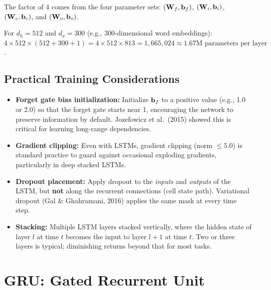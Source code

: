 \noindent The factor of 4 comes from the four parameter sets:
$(\mathbf{W}_f, \mathbf{b}_f)$, $(\mathbf{W}_i, \mathbf{b}_i)$, $(\mathbf{W}_c, \mathbf{b}_c)$, and
$(\mathbf{W}_o, \mathbf{b}_o)$.

\begin{example}
For $d_h = 512$ and $d_x = 300$ (e.g., 300-dimensional word embeddings):
$4 \times 512 \times (512 + 300 + 1) = 4 \times 512 \times 813
= 1{,}665{,}024 \approx 1.67\text{M parameters per layer}$.
\end{example}

\subsection{Practical Training Considerations}

\begin{itemize}[leftmargin=*]
\item \textbf{Forget gate bias initialization:} Initialize $\mathbf{b}_f$ to a
  positive value (e.g., 1.0 or 2.0) so that the forget gate starts near 1,
  encouraging the network to preserve information by default.  Jozefowicz
  et al.\ (2015) showed this is critical for learning long-range
  dependencies.

\item \textbf{Gradient clipping:} Even with LSTMs, gradient clipping (norm
  $\leq 5.0$) is standard practice to guard against occasional exploding
  gradients, particularly in deep stacked LSTMs.

\item \textbf{Dropout placement:} Apply dropout to the \emph{inputs} and
  \emph{outputs} of the LSTM, but \textbf{not} along the recurrent
  connections (cell state path).  Variational dropout (Gal \& Ghahramani,
  2016) applies the same mask at every time step.

\item \textbf{Stacking:} Multiple LSTM layers stacked vertically, where the
  hidden state of layer $l$ at time $t$ becomes the input to layer $l+1$ at
  time $t$.  Two or three layers is typical; diminishing returns beyond that
  for most tasks.
\end{itemize}


\section{GRU: Gated Recurrent Unit}
\label{sec:gru}

